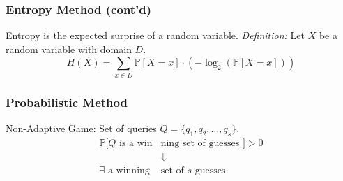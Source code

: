 \documentclass{beamer}
\begin{document}
	\begin{frame}
	\frametitle{Entropy Method (cont'd)}
	Entropy is the expected surprise of a random variable.
	\textit{Definition:} Let $X$ be a random variable with domain $D$.
			\begin{equation*}
			H(X) = \sum_{x\in D}\mathbb{P}[X=x]\cdot(-\log_2\left(\mathbb{P}[X=x]\right))
			\end{equation*}
    \end{frame}
    
    \begin{frame}
    \frametitle{Probabilistic Method}
    Non-Adaptive Game: Set of queries $Q=\{q_1, q_2, \ldots, q_s\}$.
    	\begin{align*}
		\mathbb{P}[Q\text{ is a win} & \text{ning set of guesses }] > 0 \\
		& \Downarrow \\
		\exists \text{ a winning } & \text{set of $s$ guesses}
		\end{align*}
    \end{frame}
\end{document}
